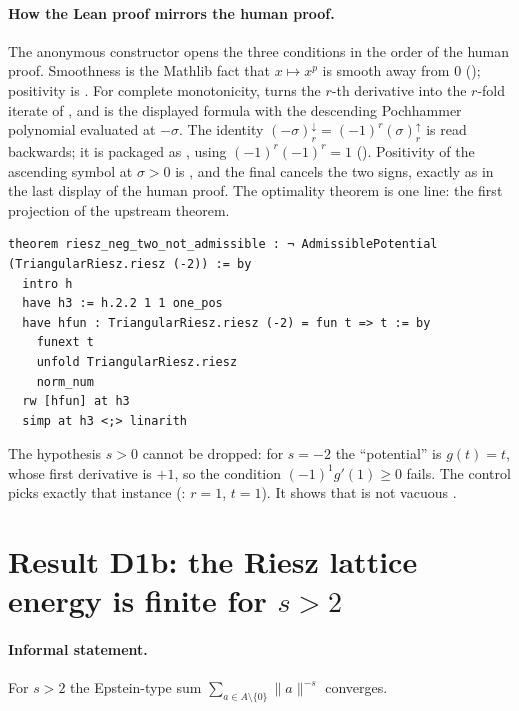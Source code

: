 \paragraph{How the Lean proof mirrors the human proof.} The anonymous constructor  opens the three
conditions in the order of the human proof. Smoothness is the Mathlib fact that $x\mapsto x^p$ is smooth away from
$0$ (); positivity is . For complete monotonicity,
 turns the $r$-th derivative into the $r$-fold iterate of , and
 is the displayed formula with the descending Pochhammer polynomial evaluated at
$-\sigma$. The identity $(-\sigma)^{\downarrow}_r=(-1)^r(\sigma)^{\uparrow}_r$ is 
read backwards; it is packaged as , using $(-1)^r(-1)^r=1$ (). Positivity of the ascending symbol
at $\sigma>0$ is , and the final  cancels the two signs, exactly as in the last
display of the human proof. The optimality theorem is one line: the first projection  of the upstream theorem.

\begin{leanbox}
\begin{lstlisting}[language=Lean]
theorem riesz_neg_two_not_admissible : ¬ AdmissiblePotential (TriangularRiesz.riesz (-2)) := by
  intro h
  have h3 := h.2.2 1 1 one_pos
  have hfun : TriangularRiesz.riesz (-2) = fun t => t := by
    funext t
    unfold TriangularRiesz.riesz
    norm_num
  rw [hfun] at h3
  simp at h3 <;> linarith
\end{lstlisting}
\end{leanbox}
The hypothesis $s>0$ cannot be dropped: for $s=-2$ the ``potential'' is $g(t)=t$, whose first derivative is $+1$, so
the condition $(-1)^1g'(1)\ge0$ fails. The control picks exactly that instance (: $r=1$, $t=1$). It
shows that  is not vacuous \tierA.

\section{Result D1b: the Riesz lattice energy is finite for $s>2$}\label{ch2:sec:d1b}

\paragraph{Informal statement.} For $s>2$ the Epstein-type sum $\sum_{a\in A\setminus\{0\}}\|a\|^{-s}$ converges.

